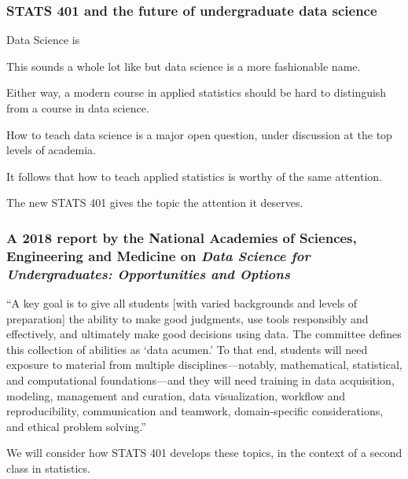 \documentclass{beamer}
\begin{document}
 

\begin{frame}


  \vspace{5mm}
  
\frametitle{STATS 401 and the future of undergraduate data science}

\begin{myitemize}

\item Data Science is 

\item This sounds a whole lot like  but data science is a more fashionable name.

\item Either way, a modern course in applied statistics should be hard to distinguish from a course in data science.

\item How to teach data science is a major open question, under discussion at the top levels of academia.

\item It follows that how to teach applied statistics is worthy of the same attention.

\item The new STATS 401 gives the topic the attention it deserves.
\end{myitemize}
\end{frame}


\begin{frame}
\frametitle{A 2018 report by the National Academies of Sciences, Engineering and Medicine on {\em  Data Science for Undergraduates: Opportunities and Options}}


\begin{myitemize}

\item ``A key goal is to give all students [with varied backgrounds and levels of preparation] the ability to make good judgments, use tools responsibly and effectively, and ultimately make good decisions using data. The committee defines this collection of abilities as `data acumen.' To that end, students will need exposure to material from multiple disciplines---notably, mathematical, statistical, and computational foundations---and they will need training in data acquisition, modeling, management and curation, data visualization, workflow and reproducibility, communication and teamwork, domain-specific considerations, and ethical problem solving.''

\item We will consider how STATS 401 develops these topics, in the context of a second class in statistics.

\end{myitemize}
\end{frame}
\end{document}
